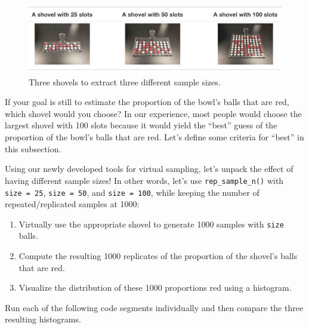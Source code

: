 \documentclass[
]{book}
\providecommand{\tightlist}{%
  \setlength{\itemsep}{0pt}\setlength{\parskip}{0pt}}
\begin{document}
\begin{figure}

{\centering \includegraphics[width=1\linewidth]{images/sampling/balls/three_shovels} 

}

\caption{Three shovels to extract three different sample sizes.}\label{fig:three-shovels}
\end{figure}

If your goal is still to estimate the proportion of the bowl's balls that are red, which shovel would you choose? In our experience, most people would choose the largest shovel with 100 slots because it would yield the ``best'' guess of the proportion of the bowl's balls that are red. Let's define some criteria for ``best'' in this subsection.

Using our newly developed tools for virtual sampling, let's unpack the effect of having different sample sizes! In other words, let's use \texttt{rep\_sample\_n()} with \texttt{size\ =\ 25}, \texttt{size\ =\ 50}, and \texttt{size\ =\ 100}, while keeping the number of repeated/replicated samples at 1000:

\begin{enumerate}
\def\labelenumi{\arabic{enumi}.}
\tightlist
\item
  Virtually use the appropriate shovel to generate 1000 samples with \texttt{size} balls.
\item
  Compute the resulting 1000 replicates of the proportion of the shovel's balls that are red.
\item
  Visualize the distribution of these 1000 proportions red using a histogram.
\end{enumerate}

Run each of the following code segments individually and then compare the three resulting histograms.
\end{document}
